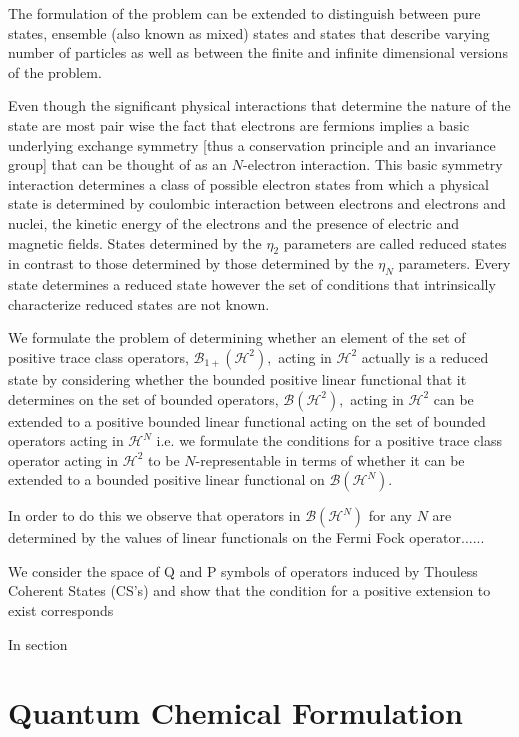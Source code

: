 \documentclass[aps,preprint]{revtex4}%
\begin{document}
The formulation of the problem can be extended to distinguish between pure
states, ensemble (also known as mixed) states and states that describe varying
number of particles as well as between the finite and infinite dimensional
versions of the problem.

Even though the significant physical interactions that determine the nature of
the state are most pair wise the fact that electrons are fermions implies a
basic underlying exchange symmetry [thus a conservation principle and an
invariance group] that can be thought of as an $N$-electron interaction. This
basic symmetry interaction determines a class of possible electron states from
which a physical state is determined by coulombic interaction between
electrons and electrons and nuclei, the kinetic energy of the electrons and
the presence of electric and magnetic fields. States determined by the
$\eta_{2}$ parameters are called reduced states in contrast to those
determined by those determined by the $\eta_{N}$ parameters. Every state
determines a reduced state however the set of conditions that intrinsically
characterize reduced states are not known.

We formulate the problem of determining whether an element of the set of
positive trace class operators, $\mathcal{B}_{1+}\left(  \mathcal{H}%
^{2}\right)  ,$ acting in $\mathcal{H}^{2}$ actually is a reduced state by
considering whether the bounded positive linear functional that it determines
on the set of bounded operators, $\mathcal{B}\left(  \mathcal{H}^{2}\right)
,$ acting in $\mathcal{H}^{2}$ can be extended to a positive bounded linear
functional acting on the set of bounded operators acting in $\mathcal{H}^{N}$
i.e. we formulate the conditions for a positive trace class operator acting in
$\mathcal{H}^{2}$ to be $N$-representable in terms of whether it can be
extended to a bounded positive linear functional on $\mathcal{B}\left(
\mathcal{H}^{N}\right)  .$

In order to do this we observe that operators in $\mathcal{B}\left(
\mathcal{H}^{N}\right)  $ for any $N$ are determined by the values of linear
functionals on the Fermi Fock operator......

We consider the space of Q and P symbols of operators induced by Thouless
Coherent States (CS's) and show that the condition for a positive extension to
exist corresponds

In section

\section{Quantum Chemical Formulation}
\end{document}
